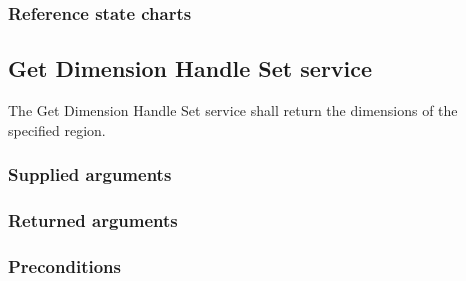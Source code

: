 \begin{compactstdpage}
    \subsubsection{Reference state charts}


    \subsection{Get Dimension Handle Set service}

    The Get Dimension Handle Set service shall return the dimensions of the specified region.

    \subsubsection{Supplied arguments}


    \subsubsection{Returned arguments}


    \subsubsection{Preconditions}

\end{compactstdpage}

\clearpage

